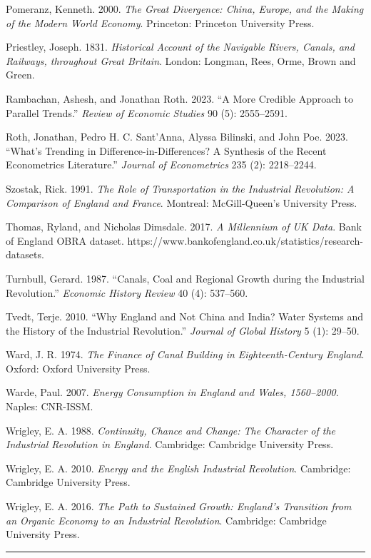 \documentclass[
  11pt,
]{article}
\begin{document}
Pomeranz, Kenneth. 2000. \emph{The Great Divergence: China, Europe, and
the Making of the Modern World Economy}. Princeton: Princeton University
Press.

Priestley, Joseph. 1831. \emph{Historical Account of the Navigable
Rivers, Canals, and Railways, throughout Great Britain}. London:
Longman, Rees, Orme, Brown and Green.

Rambachan, Ashesh, and Jonathan Roth. 2023. ``A More Credible Approach
to Parallel Trends.'' \emph{Review of Economic Studies} 90 (5):
2555--2591.

Roth, Jonathan, Pedro H. C. Sant'Anna, Alyssa Bilinski, and John Poe.
2023. ``What's Trending in Difference-in-Differences? A Synthesis of the
Recent Econometrics Literature.'' \emph{Journal of Econometrics} 235
(2): 2218--2244.

Szostak, Rick. 1991. \emph{The Role of Transportation in the Industrial
Revolution: A Comparison of England and France}. Montreal:
McGill-Queen's University Press.

Thomas, Ryland, and Nicholas Dimsdale. 2017. \emph{A Millennium of UK
Data}. Bank of England OBRA dataset.
https://www.bankofengland.co.uk/statistics/research-datasets.

Turnbull, Gerard. 1987. ``Canals, Coal and Regional Growth during the
Industrial Revolution.'' \emph{Economic History Review} 40 (4):
537--560.

Tvedt, Terje. 2010. ``Why England and Not China and India? Water Systems
and the History of the Industrial Revolution.'' \emph{Journal of Global
History} 5 (1): 29--50.

Ward, J. R. 1974. \emph{The Finance of Canal Building in
Eighteenth-Century England}. Oxford: Oxford University Press.

Warde, Paul. 2007. \emph{Energy Consumption in England and Wales,
1560--2000}. Naples: CNR-ISSM.

Wrigley, E. A. 1988. \emph{Continuity, Chance and Change: The Character
of the Industrial Revolution in England}. Cambridge: Cambridge
University Press.

Wrigley, E. A. 2010. \emph{Energy and the English Industrial
Revolution}. Cambridge: Cambridge University Press.

Wrigley, E. A. 2016. \emph{The Path to Sustained Growth: England's
Transition from an Organic Economy to an Industrial Revolution}.
Cambridge: Cambridge University Press.

\begin{center}\rule{0.5\linewidth}{0.5pt}\end{center}
\end{document}
